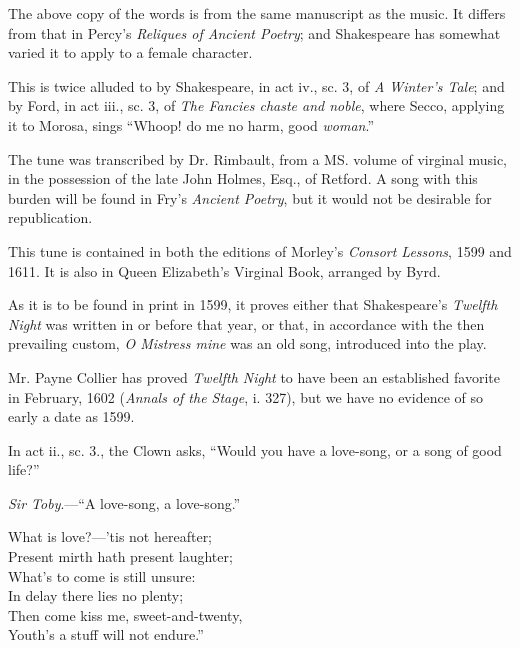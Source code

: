 The above copy of the words is from the same manuscript as the music. It
differs from that in Percy’s \textit{Reliques of Ancient Poetry}; and Shakespeare has
somewhat varied it to apply to a female character.


This is twice alluded to by Shakespeare, in act iv., sc. 3, of \textit{A Winter’s Tale};
and by Ford, in act iii., sc. 3, of \textit{The Fancies chaste and noble}, where Secco,
applying it to Morosa, sings “Whoop! do me no harm, good \textit{woman}.”

The tune was transcribed by Dr. Rimbault, from a MS. volume of virginal
music, in the possession of the late John Holmes, Esq., of Retford. A song with
this burden will be found in Fry’s \textit{Ancient Poetry}, but it would not be desirable
for republication.



\pagebreak


This tune is contained in both the editions of Morley’s \textit{Consort Lessons}, 1599
and 1611. It is also in Queen Elizabeth’s Virginal Book, arranged by Byrd.

As it is to be found in print in 1599, it proves either that Shakespeare’s \textit{Twelfth
Night} was written in or before that year, or that, in accordance with the then prevailing
custom, \textit{O Mistress mine} was an old song, introduced into the play.

Mr. Payne Collier has proved \textit{Twelfth Night} to have been an established
favorite in February, 1602 (\textit{Annals of the Stage}, i. 327), but we have no evidence
of so early a date as 1599.

In act ii., sc. 3., the Clown asks, “Would you have a love-song, or a song of
good life?”

\textit{Sir Toby}.—“A love-song, a love-song.”



\vspace{-1.5\baselineskip}

\settowidth{\versewidth}{Then come kiss me, sweet-and-twenty,}
\begin{scverse}\begin{patverse}
What is love?—’tis not hereafter;\\
Present mirth hath present laughter;\\
What’s to come is still unsure:\\
In delay there lies no plenty;\\
Then come kiss me, sweet-and-twenty,\\
Youth’s a stuff will not endure.”
\end{patverse}
\end{scverse}


